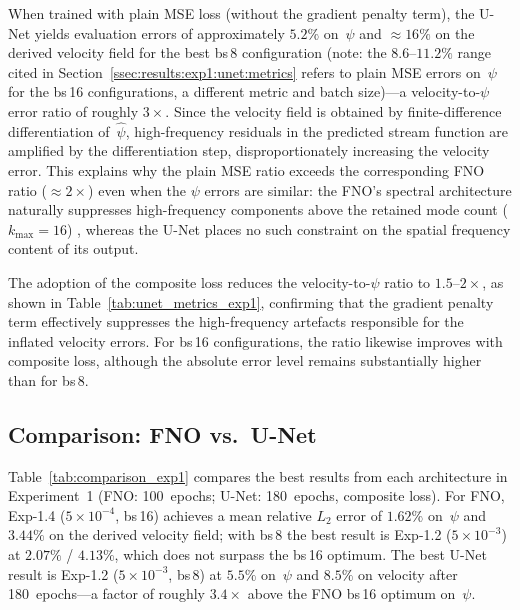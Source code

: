 When trained with plain MSE loss (without the gradient penalty term), the U-Net yields evaluation errors of approximately $5.2\%$ on~$\psi$ and $\approx 16\%$ on the derived velocity field for the best bs\,8 configuration (note: the $8.6$–$11.2\%$ range cited in Section~\ref{ssec:results:exp1:unet:metrics} refers to plain MSE errors on~$\psi$ for the bs\,16 configurations, a different metric and batch size)—a velocity-to-$\psi$ error ratio of roughly $3\times$. Since the velocity field is obtained by finite-difference differentiation of~$\hat\psi$, high-frequency residuals in the predicted stream function are amplified by the differentiation step, disproportionately increasing the velocity error. This explains why the plain MSE ratio exceeds the corresponding FNO ratio ($\approx 2\times$) even when the $\psi$ errors are similar: the FNO's spectral architecture naturally suppresses high-frequency components above the retained mode count ($k_{\max} = 16$) \parencite{qin_toward_2024}, whereas the U-Net places no such constraint on the spatial frequency content of its output.

The adoption of the composite loss reduces the velocity-to-$\psi$ ratio to $1.5$–$2\times$, as shown in Table~\ref{tab:unet_metrics_exp1}, confirming that the gradient penalty term effectively suppresses the high-frequency artefacts responsible for the inflated velocity errors. For bs\,16 configurations, the ratio likewise improves with composite loss, although the absolute error level remains substantially higher than for bs\,8.
\subsection{Comparison: FNO vs.\ U-Net}
\label{ssec:results:exp1:comparison}

Table~\ref{tab:comparison_exp1} compares the best results from each architecture in Experiment~1 (FNO: 100~epochs; U-Net: 180~epochs, composite loss). For FNO, Exp-1.4 ($5\times10^{-4}$, bs\,16) achieves a mean relative $L_2$ error of $1.62\%$ on~$\psi$ and $3.44\%$ on the derived velocity field; with bs\,8 the best result is Exp-1.2 ($5\times10^{-3}$) at $2.07\%$ / $4.13\%$, which does not surpass the bs\,16 optimum. The best U-Net result is Exp-1.2 ($5\times10^{-3}$, bs\,8) at $5.5\%$ on~$\psi$ and $8.5\%$ on velocity after 180~epochs—a factor of roughly $3.4\times$ above the FNO bs\,16 optimum on~$\psi$.

